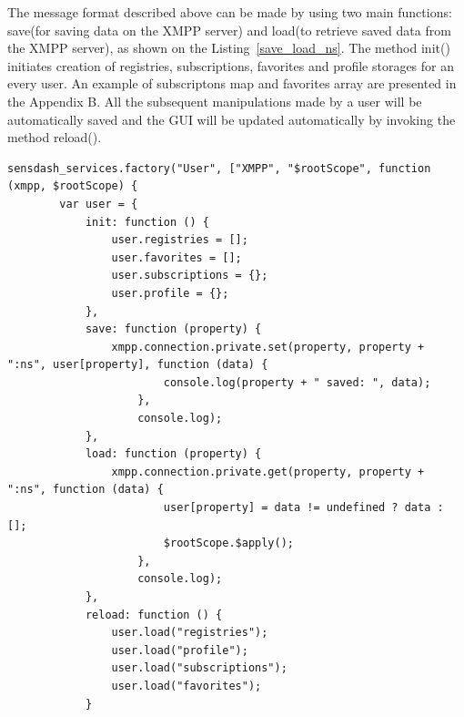     The message format described above can be made by using two main functions: save(for saving data on the XMPP server) and load(to retrieve saved data from the XMPP server), as shown on the Listing~\ref{save_load_ns}. The method init() initiates creation of registries, subscriptions, favorites and profile storages for an every user. An example of subscriptons map and favorites array are presented in the Appendix B. All the subsequent manipulations made by a user will be automatically saved and the GUI will be updated automatically by invoking the method reload().
	\begin{lstlisting}[label=save_load_ns,caption=Snippet of Save/Load preferences to a private namespace]
	    sensdash_services.factory("User", ["XMPP", "$rootScope", function (xmpp, $rootScope) {
        var user = {
            init: function () {
                user.registries = [];
                user.favorites = [];
                user.subscriptions = {};
                user.profile = {};
            },
            save: function (property) {
                xmpp.connection.private.set(property, property + ":ns", user[property], function (data) {
                        console.log(property + " saved: ", data);
                    },
                    console.log);
            },
            load: function (property) {
                xmpp.connection.private.get(property, property + ":ns", function (data) {
                        user[property] = data != undefined ? data : [];
                        $rootScope.$apply();
                    },
                    console.log);
            },
            reload: function () {
                user.load("registries");
                user.load("profile");
                user.load("subscriptions");
                user.load("favorites");
            }
	\end{lstlisting}

